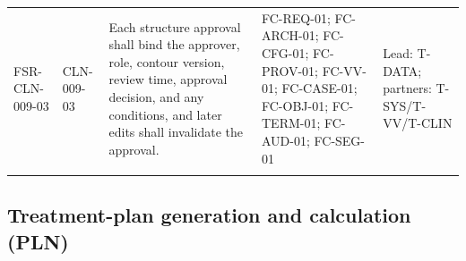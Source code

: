 \documentclass[11pt,letterpaper]{article}
\begin{document}
\begin{scriptsize}
\begin{longtable}{@{}L{0.16\textwidth}L{0.10\textwidth}L{0.31\textwidth}L{0.23\textwidth}L{0.125\textwidth}@{}}
\addlinespace[2pt]
\mbox{FSR-CLN-009-03} & \mbox{CLN-009-03} & Each structure approval shall bind the approver, role, contour version, review time, approval decision, and any conditions, and later edits shall invalidate the approval. & FC-REQ-01; FC-ARCH-01; FC-CFG-01; FC-PROV-01; FC-VV-01; FC-CASE-01; FC-OBJ-01; FC-TERM-01; FC-AUD-01; FC-SEG-01 & Lead: T-DATA; partners: T-SYS\slash\allowbreak{}T-VV\slash\allowbreak{}T-CLIN \\
\addlinespace[2pt]
\end{longtable}
\end{scriptsize}

\subsection{Treatment-plan generation and calculation (PLN)}
\end{document}

